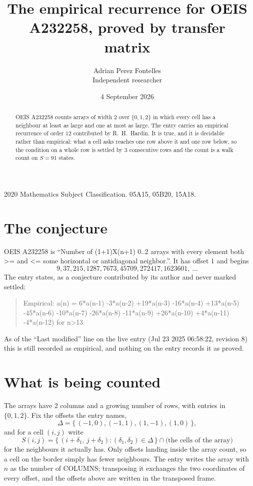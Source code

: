 \documentclass[11pt,a4paper]{article}
\title{The empirical recurrence for OEIS A232258, proved by transfer matrix}
\author{Adrian Perez Fontelles\\ \small Independent researcher}
\date{4 September 2026}
\theoremstyle{plain}
\theoremstyle{definition}
\begin{document}
\maketitle

\begin{abstract}
OEIS A232258 counts arrays of width $2$ over $\{0,1,2\}$ in which every cell has a neighbour at least as large and one at most as large. The entry carries an
empirical recurrence of order $12$ contributed by R.~H.~Hardin. It is true, and it is
decidable rather than empirical: what a cell asks reaches one row above it and one row below, so the
condition on a whole row is settled by $3$ consecutive rows and the count is a walk
count on $S=91$ states.
\end{abstract}

\noindent\small 2020 Mathematics Subject Classification. 05A15, 05B20, 15A18.\normalsize

\section{The conjecture}

OEIS A232258 is ``Number of (1+1)X(n+1) 0..2 arrays with every element both >= and <= some horizontal or antidiagonal neighbor.''. It has offset $1$ and begins
\[
9, 37, 215, 1287, 7673, 45709, 272417, 1623601,\ \dots
\]
The entry states, as a conjecture contributed by its author and never marked settled:
\begin{quote}
Empirical: a(n) = 6*a(n-1) -3*a(n-2) +19*a(n-3) -16*a(n-4) +13*a(n-5) -45*a(n-6) -10*a(n-7) -26*a(n-8) -11*a(n-9) +26*a(n-10) +4*a(n-11) -4*a(n-12) for n>13.
\end{quote}
As of the ``Last modified'' line on the live entry (Jul 23 2025 06:58:22, revision 8) this is still
recorded as empirical, and nothing on the entry records it as proved.

\section{What is being counted}

The arrays have $2$ columns and a growing number of rows, with entries in $\{0,1,2\}$. Fix the
offsets the entry names,
\[
\Delta=\{\,(-1,0), (-1,1), (1,-1), (1,0)\,\},
\]
and for a cell $(i,j)$ write
\[
S(i,j)=\{\,(i+\delta_1,\,j+\delta_2) : (\delta_1,\delta_2)\in\Delta\,\}\cap
\text{(the cells of the array)}
\]
for the neighbours it actually has. Only offsets landing inside the array count, so a cell on
the border simply has fewer neighbours. The entry writes the array with $n$ as the number of COLUMNS; transposing it exchanges the two coordinates of every offset, and the offsets above are written in the transposed frame.
\end{document}
